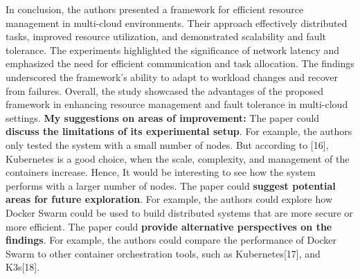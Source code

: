 In conclusion, the authors presented a framework for efficient resource management in multi-cloud environments. Their approach effectively distributed tasks, improved resource utilization, and demonstrated scalability and fault tolerance. The experiments highlighted the significance of network latency and emphasized the need for efficient communication and task allocation. The findings underscored the framework's ability to adapt to workload changes and recover from failures. Overall, the study showcased the advantages of the proposed framework in enhancing resource management and fault tolerance in multi-cloud settings.
\newline\newline
\textbf{My suggestions on areas of improvement:}
\newline\newline
The paper could \textbf{discuss the limitations of its experimental setup}. For example, the authors only tested the system with a small number of nodes. But according to [16], Kubernetes is a good choice, when the scale, complexity, and management of the containers increase.  Hence, It would be interesting to see how the system performs with a larger number of nodes.
\newline
The paper could \textbf{suggest potential areas for future exploration}. For example, the authors could explore how Docker Swarm could be used to build distributed systems that are more secure or more efficient.\newline
The paper could \textbf{provide alternative perspectives on the findings}. For example, the authors could compare the performance of Docker Swarm to other container orchestration tools, such as Kubernetes[17], and K3s[18]. \newline


\newpage


